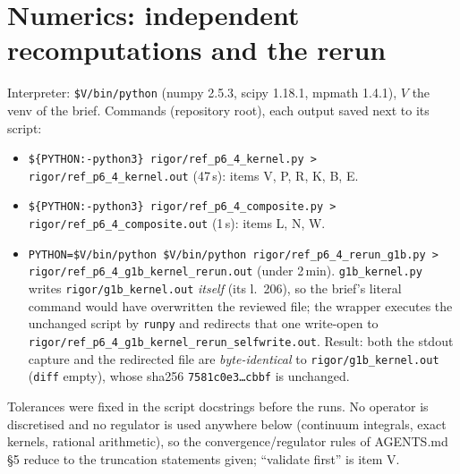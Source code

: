 \documentclass[11pt]{article}
\begin{document}
\section{Numerics: independent recomputations and the rerun}\label{sec:num}
Interpreter: \texttt{\$V/bin/python} (numpy 2.5.3, scipy 1.18.1, mpmath 1.4.1), $V$ the venv of the brief.  Commands
(repository root), each output saved next to its script:
\begin{itemize}[leftmargin=1.5em]
\item \texttt{\$\{PYTHON:-python3\} rigor/ref\_p6\_4\_kernel.py > rigor/ref\_p6\_4\_kernel.out} (47\,s): items V, P, R, K, B, E.
\item \texttt{\$\{PYTHON:-python3\} rigor/ref\_p6\_4\_composite.py > rigor/ref\_p6\_4\_composite.out} (1\,s): items L, N, W.
\item \texttt{PYTHON=\$V/bin/python \$V/bin/python rigor/ref\_p6\_4\_rerun\_g1b.py > rigor/ref\_p6\_4\_g1b\_kernel\_rerun.out}
 (under 2\,min).  \texttt{g1b\_kernel.py} writes \texttt{rigor/g1b\_kernel.out} \emph{itself} (its l.~206), so the brief's literal
 command would have overwritten the reviewed file; the wrapper executes the unchanged script by \texttt{runpy} and
 redirects that one write-open to \texttt{rigor/ref\_p6\_4\_g1b\_kernel\_rerun\_selfwrite.out}.  Result: both the stdout capture
 and the redirected file are \emph{byte-identical} to \texttt{rigor/g1b\_kernel.out} (\texttt{diff} empty), whose sha256
 \texttt{7581c0e3\dots cbbf} is unchanged.
\end{itemize}
Tolerances were fixed in the script docstrings before the runs.  No operator is discretised and no regulator is used
anywhere below (continuum integrals, exact kernels, rational arithmetic), so the convergence/regulator rules of
AGENTS.md \S5 reduce to the truncation statements given; ``validate first'' is item V.
\end{document}
